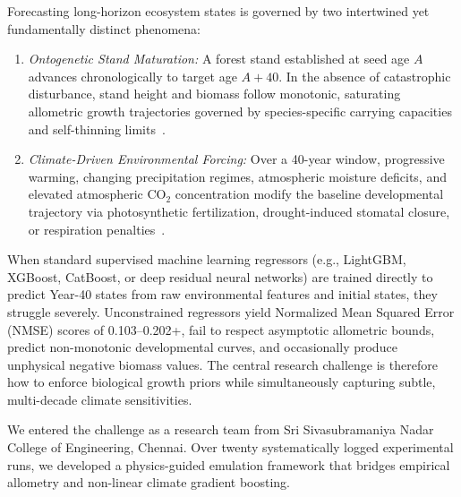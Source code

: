 \documentclass[conference]{IEEEtran}
\begin{document}
Forecasting long-horizon ecosystem states is governed by two intertwined yet fundamentally distinct phenomena:
\begin{enumerate}
    \item \textit{Ontogenetic Stand Maturation:} A forest stand established at seed age $A$ advances chronologically to target age $A + 40$. In the absence of catastrophic disturbance, stand height and biomass follow monotonic, saturating allometric growth trajectories governed by species-specific carrying capacities and self-thinning limits~\cite{reineke1933perfecting, yoda1963self}.
    \item \textit{Climate-Driven Environmental Forcing:} Over a 40-year window, progressive warming, changing precipitation regimes, atmospheric moisture deficits, and elevated atmospheric $\text{CO}_2$ concentration modify the baseline developmental trajectory via photosynthetic fertilization, drought-induced stomatal closure, or respiration penalties~\cite{sitch2008evaluation}.
\end{enumerate}

When standard supervised machine learning regressors (e.g., LightGBM, XGBoost, CatBoost, or deep residual neural networks) are trained directly to predict Year-40 states from raw environmental features and initial states, they struggle severely. Unconstrained regressors yield Normalized Mean Squared Error (NMSE) scores of 0.103--0.202+, fail to respect asymptotic allometric bounds, predict non-monotonic developmental curves, and occasionally produce unphysical negative biomass values. The central research challenge is therefore how to enforce biological growth priors while simultaneously capturing subtle, multi-decade climate sensitivities.

We entered the challenge as a research team from Sri Sivasubramaniya Nadar College of Engineering, Chennai. Over twenty systematically logged experimental runs, we developed a physics-guided emulation framework that bridges empirical allometry and non-linear climate gradient boosting.
\end{document}

